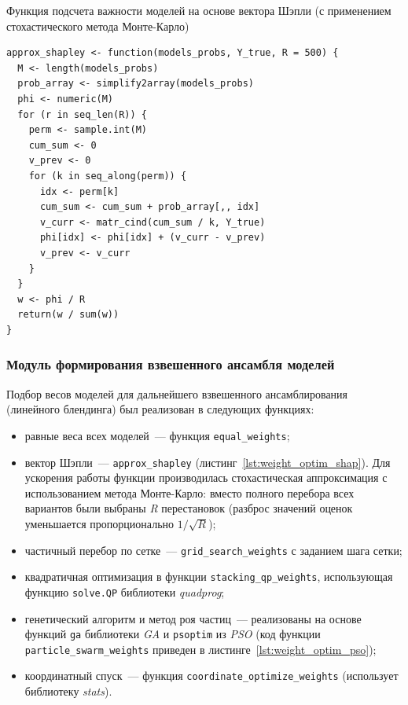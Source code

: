 \begin{listing}
    \caption{Функция подсчета важности моделей на основе вектора Шэпли (с применением стохастического метода Монте-Карло)}
    \label{lst:weight_optim_shap}
    \begin{verbatim}
approx_shapley <- function(models_probs, Y_true, R = 500) {
  M <- length(models_probs)
  prob_array <- simplify2array(models_probs)
  phi <- numeric(M)
  for (r in seq_len(R)) {
    perm <- sample.int(M)
    cum_sum <- 0
    v_prev <- 0
    for (k in seq_along(perm)) {
      idx <- perm[k]
      cum_sum <- cum_sum + prob_array[,, idx]
      v_curr <- matr_cind(cum_sum / k, Y_true)
      phi[idx] <- phi[idx] + (v_curr - v_prev)
      v_prev <- v_curr
    }
  }
  w <- phi / R
  return(w / sum(w))
}
  \end{verbatim}
\end{listing}


\subsubsection{Модуль формирования взвешенного ансамбля моделей}

Подбор весов моделей для дальнейшего взвешенного ансамблирования (линейного блендинга) был реализован в следующих функциях:
\begin{itemize}
    \item равные веса всех моделей~--- функция \lstinline{equal_weights};
    \item вектор Шэпли~--- \lstinline{approx_shapley} (листинг~\ref{lst:weight_optim_shap}). Для ускорения работы функции производилась стохастическая аппроксимация с использованием метода Монте-Карло: вместо полного перебора всех вариантов были выбраны \emph{R} перестановок (разброс значений оценок уменьшается пропорционально $1/\sqrt{R}$);
    \item частичный перебор по сетке~--- \lstinline{grid_search_weights} с заданием шага сетки;
    \item квадратичная оптимизация в функции \lstinline{stacking_qp_weights}, использующая функцию \lstinline{solve.QP} библиотеки \emph{quadprog};
    \item генетический алгоритм и метод роя частиц~--- реализованы на основе функций \lstinline{ga} библиотеки \emph{GA} и \lstinline{psoptim} из \emph{PSO} (код функции \lstinline{particle_swarm_weights} приведен в листинге~\ref{lst:weight_optim_pso});
    \item координатный спуск~--- функция \lstinline{coordinate_optimize_weights} (использует библиотеку \emph{stats}).
\end{itemize}

